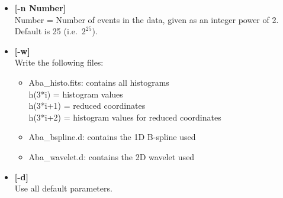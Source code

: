 \begin{itemize}
\begin{itemize}
\item {\bf [-n Number]} \\
Number = Number of events in the data, given as an integer 
power of 2. Default is 25 (i.e.\ $2^{25}$). 
\item {\bf [-w]} \\
Write the following files:
\begin{itemize}
\baselineskip=0.4truecm
\item Aba\_histo.fits: contains all histograms \\
                    h(3*i) = histogram values \\
                    h(3*i+1) = reduced coordinates \\
                    h(3*i+2) = histogram values for reduced coordinates \\
\item Aba\_bspline.d: contains the 1D B-spline used 
\item Aba\_wavelet.d: contains the 2D wavelet used 
\end{itemize}
\item {\bf [-d]}  \\
Use all default parameters.
\end{itemize}

\end{itemize}
